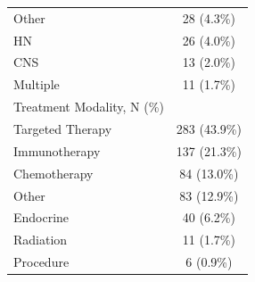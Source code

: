 \begin{table}[htbp]
\begin{tabular}{lc}
  Other & 28 (4.3\%) \\
  HN & 26 (4.0\%) \\
  CNS & 13 (2.0\%) \\
  Multiple & 11 (1.7\%) \\
\addlinespace
Treatment Modality, N (\%) &  \\
  Targeted Therapy & 283 (43.9\%) \\
  Immunotherapy & 137 (21.3\%) \\
  Chemotherapy & 84 (13.0\%) \\
  Other & 83 (12.9\%) \\
  Endocrine & 40 (6.2\%) \\
  Radiation & 11 (1.7\%) \\
  Procedure & 6 (0.9\%) \\
\bottomrule
\end{tabular}
\end{table}
